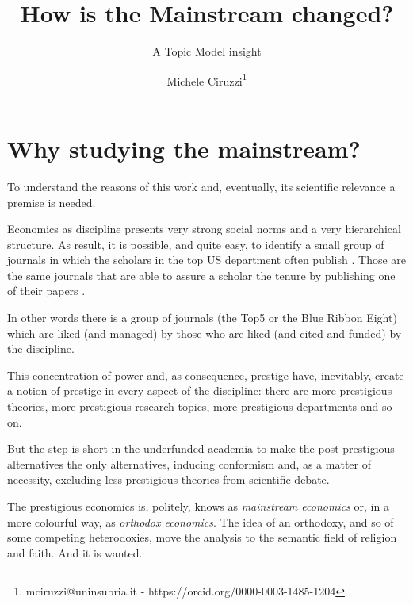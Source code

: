 \documentclass[a4paper, headings=standardclasses]{scrartcl}
\title{How is the Mainstream changed? \let\thefootnote\relax\footnotetext{This version is intended to be submitted to the XV ESHET Conference}}
\subtitle{A Topic Model insight}
\author{Michele Ciruzzi\thanks{mciruzzi@uninsubria.it - https://orcid.org/0000-0003-1485-1204}}
\begin{document}
\maketitle


\section{Why studying the mainstream?}
To understand the reasons of this work and, eventually, its scientific relevance a premise is needed.

Economics as discipline presents very strong social norms and a very hierarchical structure.
As result, it is possible, and quite easy, to identify a small group of journals in which the scholars in the top US department often publish \parencite{card2013,kim2006,kim2009,dusansky1998,hamermesh2013}.
Those are the same journals that are able to assure a scholar the tenure by publishing one of their papers \parencite{heckman2020}.

In other words there is a group of journals (the Top5 or the Blue Ribbon Eight) which are liked (and managed) by those who are liked (and cited and funded) by the discipline.

This concentration of power and, as consequence, prestige have, inevitably, create a notion of prestige in every aspect of the discipline: there are more prestigious theories, more prestigious research topics, more prestigious departments and so on.

But the step is short in the underfunded academia to make the post prestigious alternatives the only alternatives, inducing conformism and, as a matter of necessity, excluding less prestigious theories from scientific debate.

The prestigious economics is, politely, knows as \textit{mainstream economics} or, in a more colourful way, as \textit{orthodox economics}. The idea of an orthodoxy, and so of some competing heterodoxies, move the analysis to the semantic field of religion and faith. And it is wanted.
\end{document}
